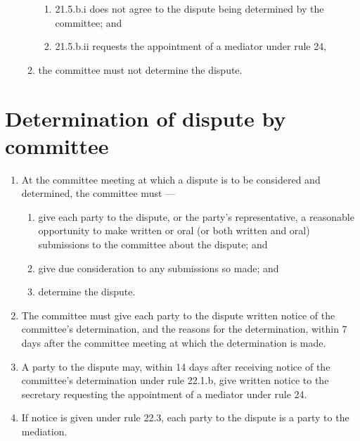 \begin{enumerate}
\begin{enumerate}
    \begin{enumerate}
    
    \item 21.5.b.i does not agree to the dispute being determined by the committee; and
    \item 21.5.b.ii requests the appointment of a mediator under rule 24,
    \end{enumerate}
  \item the committee must not determine the dispute.
  \end{enumerate}
\end{enumerate}

\hypertarget{determination-of-dispute-by-committee}{%
\section{Determination of dispute by committee}\label{determination-of-dispute-by-committee}}

\begin{enumerate}

\item At the committee meeting at which a dispute is to be considered and determined, the committee must ---

  \begin{enumerate}
  
  \item give each party to the dispute, or the party's representative, a reasonable opportunity to make written or oral (or both written and oral) submissions to the committee about the dispute; and
  \item give due consideration to any submissions so made; and
  \item determine the dispute.
  \end{enumerate}
\item The committee must give each party to the dispute written notice of the committee's determination, and the reasons for the determination, within 7 days after the committee meeting at which the determination is made.
\item A party to the dispute may, within 14 days after receiving notice of the committee's determination under rule 22.1.b, give written notice to the secretary requesting the appointment of a mediator under rule 24.
\item If notice is given under rule 22.3, each party to the dispute is a party to the mediation.
\end{enumerate}

